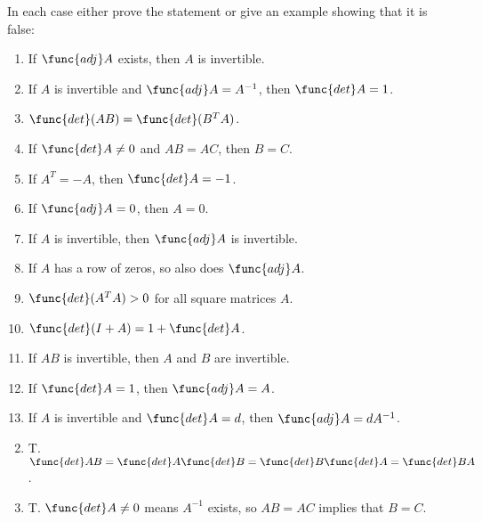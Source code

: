 \begin{multicols}{2}
\begin{ex}
In each case either prove the statement or give an example showing that it is false:


\begin{enumerate}[label={\alph*.}]
\item If $\func{adj }A$ exists, then $A$ is invertible.

\item If $A$ is invertible and $\func{adj }A = A^{-1}$, then $\func{det }A = 1$.

\item $\func{det}(AB) = \func{det}(B^{T}A)$.

\item If $\func{det }A \neq 0$ and $AB = AC$, then $B = C$.

\item If $A^{T} = -A$, then $\func{det } A = -1$.

\item If $\func{adj }A = 0$, then $A = 0$.

\item If $A$ is invertible, then $\func{adj } A$ is invertible.

\item If $A$ has a row of zeros, so also does $\func{adj } A$.

\item $\func{det}(A^{T}A) > 0$ for all square matrices $A$.

\item $\func{det}(I + A) = 1 + \func{det }A$.

\item If $AB$ is invertible, then $A$ and $B$ are invertible.

\item If $\func{det } A = 1$, then $\func{adj }A = A$.

\item If $A$ is invertible and $\func{det} A = d$, then $\func{adj} A = d A^{-1}$. 

\end{enumerate}
\begin{sol}
\begin{enumerate}[label={\alph*.}]
\setcounter{enumi}{1}
\item  T. $\func{det }AB = \func{det }A \func{det }B = \func{det }B \func{det }A = \func{det }BA$.

\setcounter{enumi}{3}
\item  T. $\func{det }A \neq 0$ means $A^{-1}$ exists, so $AB = AC$ implies that $B=C$.


\end{enumerate}
\end{sol}
\end{ex}
\end{multicols}
